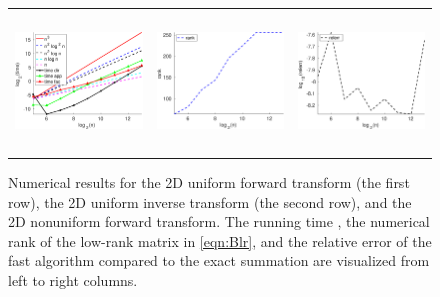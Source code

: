 \documentclass[11pt]{article}
\begin{document}
\begin{figure}
\begin{center}
\begin{tabular}{ccc}
      \\
      \includegraphics[height=1.45in]{pic/testNJPT2D_time.eps}&
      \includegraphics[height=1.45in]{pic/testNJPT2D_rank.eps}&
      \includegraphics[height=1.45in]{pic/testNJPT2D_err.eps}\\
    \end{tabular}
  \end{center}
\caption{Numerical results for the 2D uniform forward transform (the first row), the 2D uniform inverse transform (the second row), and the 2D nonuniform forward transform. The running time  {\color{blue}{(in second)}}, the numerical rank of the low-rank matrix in \eqref{eqn:Blr}, and the relative error of the fast algorithm compared to the exact summation are visualized from left to right columns.}
\label{fig:2D}
\end{figure}
\end{document}
